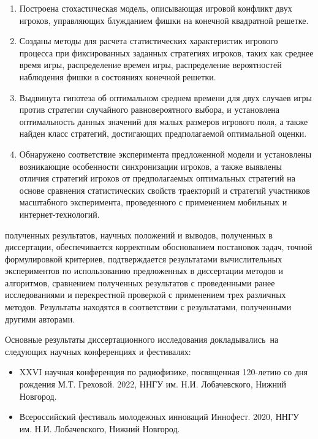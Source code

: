 {}
\begin{enumerate}[beginpenalty=10000] %
  \item Построена стохастическая модель, описывающая игровой конфликт двух игроков, управляющих блужданием фишки на конечной квадратной решетке.
  \item Созданы методы для расчета статистических характеристик игрового процесса при фиксированных заданных стратегиях игроков,
        таких как среднее время игры, распределение времен игры, распределение вероятностей наблюдения фишки в состояниях конечной решетки. 
  \item Выдвинута гипотеза об оптимальном среднем времени для двух случаев игры против стратегии случайного равновероятного выбора,
        и установлена оптимальность данных значений для малых размеров игрового поля, а также найден класс стратегий, достигающих предполагаемой оптимальной оценки.
  \item Обнаружено соответствие эксперимента предложенной модели и установлены возникающие особенности синхронизации игроков, 
        а также выявлены отличия стратегий игроков от предполагаемых оптимальных стратегий
        на основе сравнения статистических свойств траекторий и стратегий участников масштабного эксперимента, 
        проведенного с применением мобильных и интернет-технологий.
  
\end{enumerate}

{\reliability} полученных результатов, научных положений и выводов,
полученных в диссертации, обеспечивается корректным обоснованием
постановок задач, точной формулировкой критериев, подтверждается результатами
вычислительных экспериментов по использованию предложенных в
диссертации методов и алгоритмов, сравнением полученных результатов с
проведенными ранее исследованиями и перекрестной проверкой с применением трех различных методов.
Результаты находятся в соответствии с результатами, полученными другими авторами.

{\probation}
Основные результаты диссертационного исследования докладывались~на следующих научных конференциях и фестивалях:
\begin{itemize}
    \item XXVI научная конференция по радиофизике, посвященная 120-летию со дня рождения М.Т. Греховой. 2022, ННГУ им. Н.И. Лобачевского,
    Нижний Новгород.
    \item Всероссийский фестиваль молодежных инноваций Иннофест. 2020, ННГУ им. Н.И. Лобачевского,
    Нижний Новгород.
\end{itemize}


